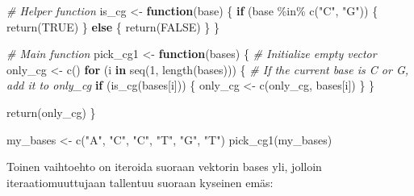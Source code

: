 \documentclass[
]{book}
\newenvironment{Shaded}{\begin{snugshade}}{\end{snugshade}}
\newcommand{\CommentTok}[1]{\textcolor[rgb]{0.56,0.35,0.01}{\textit{#1}}}
\newcommand{\ConstantTok}[1]{\textcolor[rgb]{0.00,0.00,0.00}{#1}}
\newcommand{\ControlFlowTok}[1]{\textcolor[rgb]{0.13,0.29,0.53}{\textbf{#1}}}
\newcommand{\DecValTok}[1]{\textcolor[rgb]{0.00,0.00,0.81}{#1}}
\newcommand{\FunctionTok}[1]{\textcolor[rgb]{0.00,0.00,0.00}{#1}}
\newcommand{\NormalTok}[1]{#1}
\newcommand{\OtherTok}[1]{\textcolor[rgb]{0.56,0.35,0.01}{#1}}
\newcommand{\SpecialCharTok}[1]{\textcolor[rgb]{0.00,0.00,0.00}{#1}}
\newcommand{\StringTok}[1]{\textcolor[rgb]{0.31,0.60,0.02}{#1}}
\begin{document}
\begin{Shaded}
\begin{Highlighting}[]
\CommentTok{\# Helper function}
\NormalTok{is\_cg }\OtherTok{\textless{}{-}} \ControlFlowTok{function}\NormalTok{(base) \{}
  \ControlFlowTok{if}\NormalTok{ (base }\SpecialCharTok{\%in\%} \FunctionTok{c}\NormalTok{(}\StringTok{"C"}\NormalTok{, }\StringTok{"G"}\NormalTok{)) \{}
    \FunctionTok{return}\NormalTok{(}\ConstantTok{TRUE}\NormalTok{)}
\NormalTok{  \} }\ControlFlowTok{else}\NormalTok{ \{}
    \FunctionTok{return}\NormalTok{(}\ConstantTok{FALSE}\NormalTok{)}
\NormalTok{  \}}
\NormalTok{\}}

\CommentTok{\# Main function}
\NormalTok{pick\_cg1 }\OtherTok{\textless{}{-}} \ControlFlowTok{function}\NormalTok{(bases) \{}
  \CommentTok{\# Initialize empty vector}
\NormalTok{  only\_cg }\OtherTok{\textless{}{-}} \FunctionTok{c}\NormalTok{()}
  \ControlFlowTok{for}\NormalTok{ (i }\ControlFlowTok{in} \FunctionTok{seq}\NormalTok{(}\DecValTok{1}\NormalTok{, }\FunctionTok{length}\NormalTok{(bases))) \{}
    \CommentTok{\# If the current base is C or G, add it to only\_cg}
    \ControlFlowTok{if}\NormalTok{ (}\FunctionTok{is\_cg}\NormalTok{(bases[i])) \{}
\NormalTok{      only\_cg }\OtherTok{\textless{}{-}} \FunctionTok{c}\NormalTok{(only\_cg, bases[i])}
\NormalTok{    \}}
\NormalTok{  \}}
  
  \FunctionTok{return}\NormalTok{(only\_cg)}
\NormalTok{\}}

\NormalTok{my\_bases }\OtherTok{\textless{}{-}} \FunctionTok{c}\NormalTok{(}\StringTok{"A"}\NormalTok{, }\StringTok{"C"}\NormalTok{, }\StringTok{"C"}\NormalTok{, }\StringTok{"T"}\NormalTok{, }\StringTok{"G"}\NormalTok{, }\StringTok{"T"}\NormalTok{)}
\FunctionTok{pick\_cg1}\NormalTok{(my\_bases)}
\end{Highlighting}
\end{Shaded}

Toinen vaihtoehto on iteroida suoraan vektorin bases yli, jolloin iteraatiomuuttujaan tallentuu suoraan kyseinen emäs:
\end{document}
